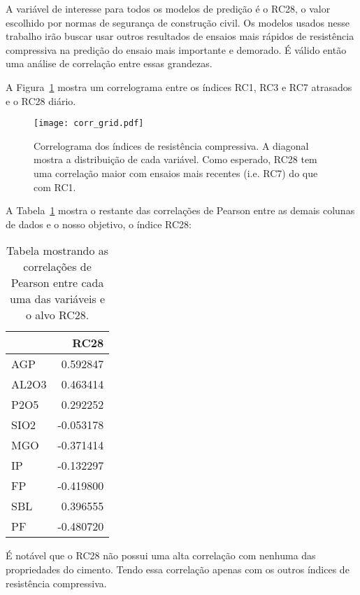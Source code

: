 A variável de interesse para todos os modelos de predição é o RC28, o valor
escolhido por normas de segurança de construção civil. Os modelos usados nesse
trabalho irão buscar usar outros resultados de ensaios mais rápidos de
resistência compressiva na predição do ensaio mais importante e demorado. É
válido então uma análise de correlação entre essas grandezas.


A Figura~\ref{fig:gridcorr} mostra um correlograma entre os índices RC1, RC3 e RC7
atrasados e o RC28 diário. 

\begin{figure}[H]
  \centering
  \texttt{[image: corr\_grid.pdf]}
  \caption{Correlograma dos índices de resistência compressiva. A diagonal
    mostra a distribuição de cada variável. Como esperado, RC28 tem uma
    correlação maior com ensaios mais recentes (i.e. RC7) do que com RC1.}
  \label{fig:gridcorr}
\end{figure}

A Tabela~\ref{tabelacorr} mostra o restante das correlações de Pearson \citep{dlbook} entre as demais
colunas de dados e o nosso objetivo, o índice RC28:


\begin{table}[H]
  \centering
\begin{tabular}{lr}
  \toprule
  {} &      RC28 \\
  \midrule
  AGP   &  0.592847 \\
  AL2O3 &  0.463414 \\
  P2O5  &  0.292252 \\
  SIO2  & -0.053178 \\
  MGO   & -0.371414 \\
  IP    & -0.132297 \\
  FP    & -0.419800 \\
  SBL   &  0.396555 \\
  PF    & -0.480720 \\
  \bottomrule
\end{tabular}
\caption{Tabela mostrando as correlações de Pearson entre cada uma das variáveis
  e o alvo RC28.} 
\label{tabelacorr}
\end{table}


É notável que o RC28 não possui uma alta correlação com nenhuma das propriedades
do cimento. Tendo essa correlação apenas com os outros índices de resistência compressiva.




